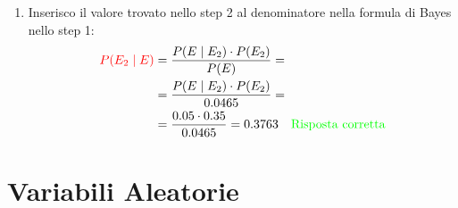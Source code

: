 \documentclass{article}  %
\theoremstyle{definition}
\begin{document}
\begin{esercizio}[Esercizio 2]
\begin{enumerate}
		      \begin{align*}
			      P(E)
			       & = \sum_{i=1}^{3} P(E \mid E_i)\cdot P(E_i) =                         \\
			       & = \left( P(E \mid E_1)\cdot P(E_1) \right)
			      + \left( P(E \mid E_2)\cdot P(E_2) \right)
			      + \left( P(E \mid E_3)\cdot P(E_3) \right) =                            \\
			       & = (0.10 \cdot 0.20) + (0.05 \cdot 0.35) + (0.02 \cdot 0.45) = 0.0465
		      \end{align*}
		\item Inserisco il valore trovato nello step 2 al denominatore nella formula di Bayes nello step 1:
		      \begin{align*}
			      \textcolor{red}{P(E_2 \mid E)}
			       & = \frac{P(E \mid E_2) \cdot P(E_2)}{P(E)} =                                               \\
			       & = \frac{P(E \mid E_2) \cdot P(E_2)}{0.0465} =                                             \\
			       & = \frac{0.05 \cdot 0.35}{0.0465}=0.3763 \quad \textcolor{green}{\text{Risposta corretta}}
		      \end{align*}
	\end{enumerate}
\end{esercizio}
\break
\section{Variabili Aleatorie}
\end{document}
